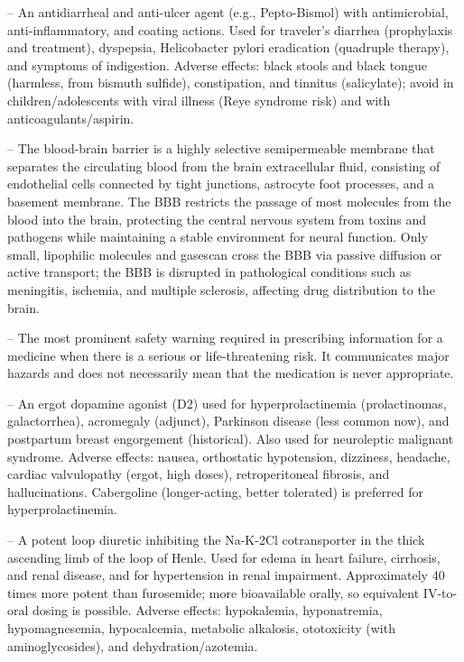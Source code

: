 -- An antidiarrheal and anti-ulcer agent (e.g., Pepto-Bismol) with antimicrobial, anti-inflammatory, and coating actions. Used for traveler's diarrhea (prophylaxis and treatment), dyspepsia, Helicobacter pylori eradication (quadruple therapy), and symptoms of indigestion. Adverse effects: black stools and black tongue (harmless, from bismuth sulfide), constipation, and tinnitus (salicylate); avoid in children/adolescents with viral illness (Reye syndrome risk) and with anticoagulants/aspirin.

-- The blood-brain barrier is a highly selective semipermeable membrane that separates the circulating blood from the brain extracellular fluid, consisting of endothelial cells connected by tight junctions, astrocyte foot processes, and a basement membrane. The BBB restricts the passage of most molecules from the blood into the brain, protecting the central nervous system from toxins and pathogens while maintaining a stable environment for neural function. Only small, lipophilic molecules and gasescan cross the BBB via passive diffusion or active transport; the BBB is disrupted in pathological conditions such as meningitis, ischemia, and multiple sclerosis, affecting drug distribution to the brain.

-- The most prominent safety warning required in prescribing information for a medicine when there is a serious or life-threatening risk. It communicates major hazards and does not necessarily mean that the medication is never appropriate.

-- An ergot dopamine agonist (D2) used for hyperprolactinemia (prolactinomas, galactorrhea), acromegaly (adjunct), Parkinson disease (less common now), and postpartum breast engorgement (historical). Also used for neuroleptic malignant syndrome. Adverse effects: nausea, orthostatic hypotension, dizziness, headache, cardiac valvulopathy (ergot, high doses), retroperitoneal fibrosis, and hallucinations. Cabergoline (longer-acting, better tolerated) is preferred for hyperprolactinemia.

-- A potent loop diuretic inhibiting the Na-K-2Cl cotransporter in the thick ascending limb of the loop of Henle. Used for edema in heart failure, cirrhosis, and renal disease, and for hypertension in renal impairment. Approximately 40 times more potent than furosemide; more bioavailable orally, so equivalent IV-to-oral dosing is possible. Adverse effects: hypokalemia, hyponatremia, hypomagnesemia, hypocalcemia, metabolic alkalosis, ototoxicity (with aminoglycosides), and dehydration/azotemia.

